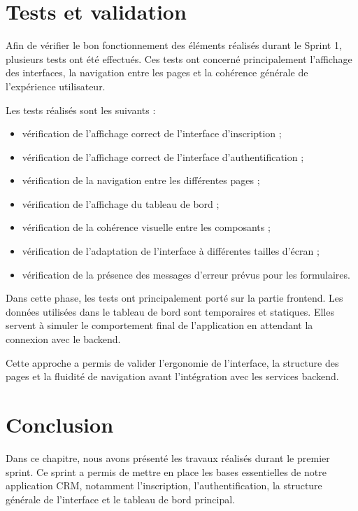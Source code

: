 \documentclass[12pt,a4paper]{report}
\begin{document}
\section{Tests et validation}

Afin de vérifier le bon fonctionnement des éléments réalisés durant le Sprint 1, plusieurs tests ont été effectués. Ces tests ont concerné principalement l’affichage des interfaces, la navigation entre les pages et la cohérence générale de l’expérience utilisateur.

Les tests réalisés sont les suivants :

\begin{itemize}
    \item vérification de l’affichage correct de l’interface d’inscription ;
    \item vérification de l’affichage correct de l’interface d’authentification ;
    \item vérification de la navigation entre les différentes pages ;
    \item vérification de l’affichage du tableau de bord ;
    \item vérification de la cohérence visuelle entre les composants ;
    \item vérification de l’adaptation de l’interface à différentes tailles d’écran ;
    \item vérification de la présence des messages d’erreur prévus pour les formulaires.
\end{itemize}

Dans cette phase, les tests ont principalement porté sur la partie frontend. Les données utilisées dans le tableau de bord sont temporaires et statiques. Elles servent à simuler le comportement final de l’application en attendant la connexion avec le backend.

Cette approche a permis de valider l’ergonomie de l’interface, la structure des pages et la fluidité de navigation avant l’intégration avec les services backend.

\section*{Conclusion}

Dans ce chapitre, nous avons présenté les travaux réalisés durant le premier sprint. Ce sprint a permis de mettre en place les bases essentielles de notre application CRM, notamment l’inscription, l’authentification, la structure générale de l’interface et le tableau de bord principal.
\end{document}
